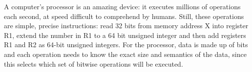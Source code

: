 %
%
%
%

A computer's processor is an amazing device: it executes millions of operations each second, at speed difficult to comprehend by humans. Still, these operations are simple, precise instructions: read 32 bits from memory address X into register R1, extend the number in R1 to a 64 bit unsigned integer and then add registers R1 and R2 as 64-bit unsigned integers. For the processor, data is made up of bits and each operation needs to know the exact size and semantics of the data, since this selects which set of bitwise operations will be executed.

